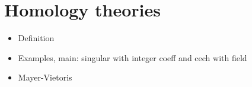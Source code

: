 
\section{Homology theories}

\begin{itemize}
	\item Definition
	\item Examples, main: singular with integer coeff and cech with field 
	\item Mayer-Vietoris
\end{itemize}